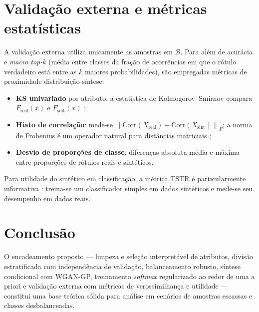 \documentclass[12pt,a4paper]{report}
\begin{document}
\section{Validação externa e métricas estatísticas}
A validação externa utiliza unicamente as amostras em $\mathcal{B}$. Para além de acurácia e \emph{macro top-$k$} (média entre classes da fração de ocorrências em que o rótulo verdadeiro está entre as $k$ maiores probabilidades), são empregadas métricas de proximidade distribuição-síntese:
\begin{itemize}
    \item \textbf{KS univariado} por atributo: a estatística de Kolmogorov--Smirnov compara $F_{\text{real}}(x)$ e $F_{\text{sint}}(x)$ \cite{Massey1951KS};
    \item \textbf{Hiato de correlação}: mede-se $\left\|\mathrm{Corr}(X_{\text{real}})-\mathrm{Corr}(X_{\text{sint}})\right\|_F$; a norma de Frobenius é um operador natural para distâncias matriciais \cite{Golub2013Matrix};
    \item \textbf{Desvio de proporções de classe}: diferenças absoluta média e máxima entre proporções de rótulos reais e sintéticos.
\end{itemize}
Para utilidade do sintético em classificação, a métrica \textsc{TSTR} é particularmente informativa \cite{Yoon2019TimeGAN,Esteban2017RGAN,Xu2019CTGAN}: treina-se um classificador simples em dados sintéticos e mede-se seu desempenho em dados reais.

\section*{Conclusão}
O encadeamento proposto --- limpeza e seleção interpretável de atributos, divisão estratificada com independência de validação, balanceamento robusto, síntese condicional com WGAN-GP, treinamento \emph{softmax} regularizado ao redor de uma a priori e validação externa com métricas de verossimilhança e utilidade --- constitui uma base teórica sólida para análise em cenários de amostras escassas e classes desbalanceadas.
\end{document}
